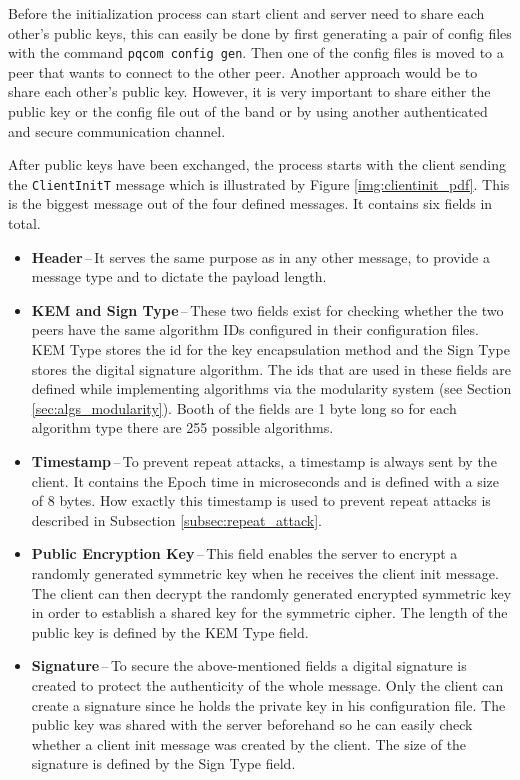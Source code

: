 Before the initialization process can start client and server need to share each other's public keys, this can easily be done by first generating a pair of config files with the command \texttt{pqcom config gen}. Then one of the config files is moved to a peer that wants to connect to the other peer. Another approach would be to share each other's public key. However, it is very important to share either the public key or the config file out of the band or by using another authenticated and secure communication channel.

After public keys have been exchanged, the process starts with the client sending the \texttt{ClientInitT} message which is illustrated by Figure \ref{img:clientinit_pdf}. This is the biggest message out of the four defined messages. It contains six fields in total.
\begin{itemize}
  \item \textbf{Header}\,--\,It serves the same purpose as in any other message, to provide a message type and to dictate the payload length.
  \item \textbf{KEM and Sign Type}\,--\,These two fields exist for checking whether the two peers have the same algorithm IDs configured in their configuration files. KEM Type stores the id for the key encapsulation method and the Sign Type stores the digital signature algorithm. The ids that are used in these fields are defined while implementing algorithms via the modularity system (see Section \ref{sec:algs_modularity}). Booth of the fields are 1 byte long so for each algorithm type there are 255 possible algorithms.
  \item \textbf{Timestamp}\,--\,To prevent repeat attacks, a timestamp is always sent by the client. It contains the Epoch time in microseconds and is defined with a size of 8 bytes. How exactly this timestamp is used to prevent repeat attacks is described in Subsection \ref{subsec:repeat_attack}.
  \item \textbf{Public Encryption Key}\,--\,This field enables the server to encrypt a randomly generated symmetric key when he receives the client init message. The client can then decrypt the randomly generated encrypted symmetric key in order to establish a shared key for the symmetric cipher. The length of the public key is defined by the KEM Type field.
  \item \textbf{Signature}\,--\,To secure the above-mentioned fields a digital signature is created to protect the authenticity of the whole message. Only the client can create a signature since he holds the private key in his configuration file. The public key was shared with the server beforehand so he can easily check whether a client init message was created by the client. The size of the signature is defined by the Sign Type field.
\end{itemize}

